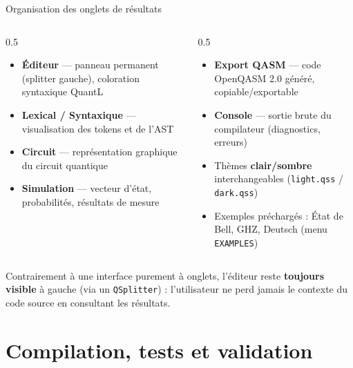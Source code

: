 \documentclass[10pt]{beamer}
\begin{document}
\begin{frame}{Organisation des onglets de résultats}
  \begin{columns}[T]
    \begin{column}{0.5\textwidth}
      \begin{itemize}
        \item \textbf{Éditeur} --- panneau permanent (splitter gauche), coloration syntaxique QuantL
        \item \textbf{Lexical / Syntaxique} --- visualisation des tokens et de l'AST
        \item \textbf{Circuit} --- représentation graphique du circuit quantique
        \item \textbf{Simulation} --- vecteur d'état, probabilités, résultats de mesure
      \end{itemize}
    \end{column}
    \begin{column}{0.5\textwidth}
      \begin{itemize}
        \item \textbf{Export QASM} --- code OpenQASM 2.0 généré, copiable/exportable
        \item \textbf{Console} --- sortie brute du compilateur (diagnostics, erreurs)
        \item Thèmes \textbf{clair/sombre} interchangeables (\texttt{light.qss} / \texttt{dark.qss})
        \item Exemples préchargés : État de Bell, GHZ, Deutsch (menu \texttt{EXAMPLES})
      \end{itemize}
    \end{column}
  \end{columns}
  \vspace{8pt}
  \begin{keybox}[title=Ergonomie]
    Contrairement à une interface purement à onglets, l'éditeur reste \textbf{toujours visible} à gauche (via un \texttt{QSplitter}) : l'utilisateur ne perd jamais le contexte du code source en consultant les résultats.
  \end{keybox}
\end{frame}

\section{Compilation, tests et validation}
\end{document}
